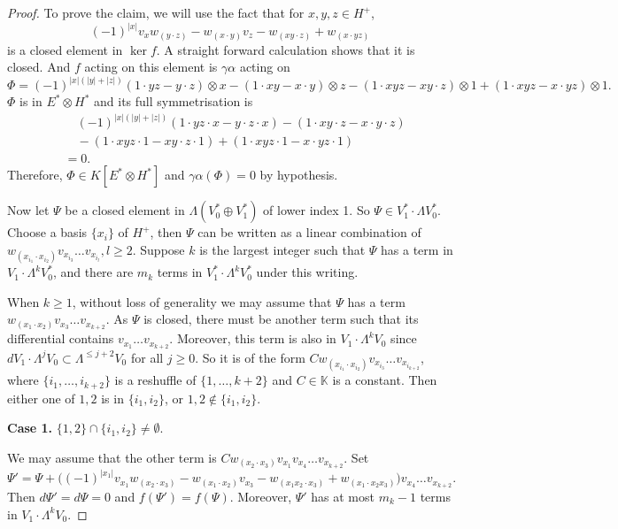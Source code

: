 \documentclass{article}
\theoremstyle{plain}
\theoremstyle{definition}
\theoremstyle{plain}
\numberwithin{equation}{section}
\begin{document}
\begin{proof}
To prove the claim, we will use the fact that for $x,y,z\in H^+$,
$$
(-1)^{|x|}v_x w_{(y\cdot z)}-w_{(x\cdot y)} v_z-w_{(xy\cdot z)}+w_{(x\cdot yz)}
$$
is a closed element in $\ker f$. A straight forward calculation shows that it is closed. And $f$ acting on this element is $\gamma\alpha$ acting on
$$
\Phi = (-1)^{|x|(|y|+|z|)} (1\cdot yz-y\cdot z)\otimes x-(1\cdot xy-x\cdot y)\otimes z-(1\cdot xyz-xy\cdot z)\otimes 1+(1\cdot xyz-x\cdot yz)\otimes 1.
$$
$\Phi$ is in $E^*\otimes H^*$ and its full symmetrisation is
\begin{align*}
& \quad (-1)^{|x|(|y|+|z|)} (1\cdot yz\cdot x-y\cdot z\cdot x)-(1\cdot xy\cdot z-x\cdot y\cdot z) \\
& \quad -(1\cdot xyz\cdot 1-xy\cdot z\cdot 1)+(1\cdot xyz\cdot 1-x\cdot yz\cdot 1) \\
& =0.
\end{align*}
Therefore, $\Phi\in K[E^*\otimes H^*]$ and $\gamma\alpha(\Phi)=0$ by hypothesis.

Now let $\Psi$ be a closed element in $\Lambda(V_0^*\oplus V_1^*)$ of lower index 1. So $\Psi\in V_1^*\cdot\Lambda V_0^*$. Choose a basis $\{ x_i\}$ of $H^+$, then $\Psi$ can be written as a linear combination of $w_{(x_{i_1}\cdot x_{i_2})}v_{x_{i_3}}\ldots v_{x_{i_l}}, l\geq 2$. Suppose $k$ is the largest integer such that $\Psi$ has a term in $V_1\cdot\Lambda^k V_0^*$, and there are $m_k$ terms in $V_1^*\cdot\Lambda^k V_0^*$ under this writing.

When $k\geq 1$, without loss of generality we may assume that $\Psi$ has a term $w_{(x_1\cdot x_2)}v_{x_3}\ldots v_{x_{k+2}}$. As $\Psi$ is closed, there must be another term such that its differential contains $v_{x_1}\ldots v_{x_{k+2}}$. Moreover, this term is also in $V_1\cdot\Lambda^k V_0$ since $dV_1\cdot\Lambda^j V_0\subset \Lambda^{\leq j+2}V_0$ for all $j\geq 0$. So it is of the form $Cw_{(x_{i_1}\cdot x_{i_2})}v_{x_{i_3}}\ldots v_{x_{i_{k+2}}}$, where $\{i_1,\ldots,i_{k+2}\}$ is a reshuffle of $\{1,\ldots,k+2\}$ and $C\in\mathbb{K}$ is a constant. Then either one of $1,2$ is in $\{i_1,i_2\}$, or $1,2\notin\{i_1,i_2\}$.

\textbf{Case 1.} $\{1,2\}\cap\{i_1,i_2\}\neq\emptyset$.

We may assume that the other term is $Cw_{(x_2\cdot x_3)}v_{x_1}v_{x_4}\ldots v_{x_{k+2}}$. Set
$$
\Psi'=\Psi+\big((-1)^{|x_1|}v_{x_1} w_{({x_2}\cdot {x_3})}-w_{(x_1\cdot x_2)} v_{x_3}-w_{(x_1x_2\cdot x_3)}+w_{(x_1\cdot x_2x_3)}\big)v_{x_4}\ldots v_{x_{k+2}}.
$$
Then $d\Psi'=d\Psi=0$ and $f(\Psi')=f(\Psi)$. Moreover, $\Psi'$ has at most $m_k-1$ terms in $V_1\cdot\Lambda^k V_0$.


\end{proof}
\end{document}
